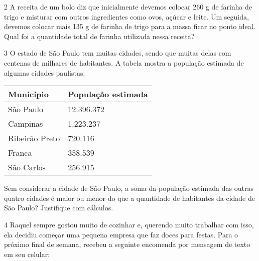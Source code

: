 
\num{2} A receita de um bolo diz que inicialmente devemos colocar 260 g de
farinha de trigo e misturar com outros ingredientes como ovos, açúcar e
leite. Um seguida, devemos colocar mais 135 g de farinha de trigo para a
massa ficar no ponto ideal. Qual foi a quantidade total de farinha
utilizada nessa receita?




\num{3} O estado de São Paulo tem muitas cidades, sendo que muitas delas com
centenas de milhares de habitantes. A tabela mostra a população estimada
de algumas cidades paulistas.

\begin{longtable}[]{@{}ll@{}}
\toprule
Município & População estimada\tabularnewline
\midrule
\endhead
São Paulo & 12.396.372\tabularnewline
Campinas & 1.223.237\tabularnewline
Ribeirão Preto & 720.116\tabularnewline
Franca & 358.539\tabularnewline
São Carlos & 256.915\tabularnewline
\bottomrule
\end{longtable}


Sem considerar a cidade de São Paulo, a soma da população estimada das
outras quatro cidades é maior ou menor do que a quantidade de habitantes
da cidade de São Paulo? Justifique com cálculos.



\num{4} Raquel sempre gostou muito de cozinhar e,
querendo muito trabalhar com isso, ela decidiu começar uma pequena
empresa que faz doces para festas. Para o próximo final de semana, recebeu a seguinte encomenda por mensagem de texto em seu celular:


